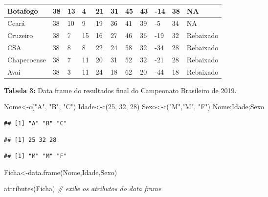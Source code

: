 \documentclass[
]{book}
\newenvironment{Shaded}{\begin{snugshade}}{\end{snugshade}}
\newcommand{\CommentTok}[1]{\textcolor[rgb]{0.56,0.35,0.01}{\textit{#1}}}
\newcommand{\DecValTok}[1]{\textcolor[rgb]{0.00,0.00,0.81}{#1}}
\newcommand{\FunctionTok}[1]{\textcolor[rgb]{0.00,0.00,0.00}{#1}}
\newcommand{\NormalTok}[1]{#1}
\newcommand{\OtherTok}[1]{\textcolor[rgb]{0.56,0.35,0.01}{#1}}
\newcommand{\StringTok}[1]{\textcolor[rgb]{0.31,0.60,0.02}{#1}}
\begin{document}
\begin{table}
\begin{tabular}{l|l|l|l|l|l|l|l|l|l|l}
\hline
Botafogo & 38 & 13 & 4 & 21 & 31 & 45 & 43 & -14 & 38 & NA\\
\hline
Ceará & 38 & 10 & 9 & 19 & 36 & 41 & 39 & -5 & 34 & NA\\
\hline
Cruzeiro & 38 & 7 & 15 & 16 & 27 & 46 & 36 & -19 & 32 & Rebaixado\\
\hline
CSA & 38 & 8 & 8 & 22 & 24 & 58 & 32 & -34 & 28 & Rebaixado\\
\hline
Chapecoense & 38 & 7 & 11 & 20 & 31 & 52 & 32 & -21 & 28 & Rebaixado\\
\hline
Avaí & 38 & 3 & 11 & 24 & 18 & 62 & 20 & -44 & 18 & Rebaixado\\
\hline
\end{tabular}
\endgroup{}
\end{table}

\textbf{Tabela 3:} Data frame do resultados final do Campeonato Brasileiro de 2019.

\begin{Shaded}
\begin{Highlighting}[]
\NormalTok{Nome}\OtherTok{\textless{}{-}}\FunctionTok{c}\NormalTok{(}\StringTok{"A"}\NormalTok{, }\StringTok{"B"}\NormalTok{, }\StringTok{"C"}\NormalTok{)}
\NormalTok{Idade}\OtherTok{\textless{}{-}}\FunctionTok{c}\NormalTok{(}\DecValTok{25}\NormalTok{, }\DecValTok{32}\NormalTok{, }\DecValTok{28}\NormalTok{)}
\NormalTok{Sexo}\OtherTok{\textless{}{-}}\FunctionTok{c}\NormalTok{(}\StringTok{"M"}\NormalTok{,}\StringTok{"M"}\NormalTok{, }\StringTok{"F"}\NormalTok{)}
\NormalTok{Nome;Idade;Sexo}
\end{Highlighting}
\end{Shaded}

\begin{verbatim}
## [1] "A" "B" "C"
\end{verbatim}

\begin{verbatim}
## [1] 25 32 28
\end{verbatim}

\begin{verbatim}
## [1] "M" "M" "F"
\end{verbatim}

\begin{Shaded}
\begin{Highlighting}[]
\NormalTok{Ficha}\OtherTok{\textless{}{-}}\FunctionTok{data.frame}\NormalTok{(Nome,Idade,Sexo)}

\FunctionTok{attributes}\NormalTok{(Ficha) }\CommentTok{\# exibe os atributos do data frame}
\end{Highlighting}
\end{Shaded}
\end{document}
